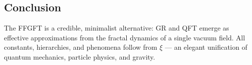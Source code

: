	\subsection*{Conclusion}
	
	The FFGFT is a credible, minimalist alternative: GR and QFT emerge as effective approximations from the fractal dynamics of a single vacuum field. All constants, hierarchies, and phenomena follow from \(\xi\) — an elegant unification of quantum mechanics, particle physics, and gravity.



